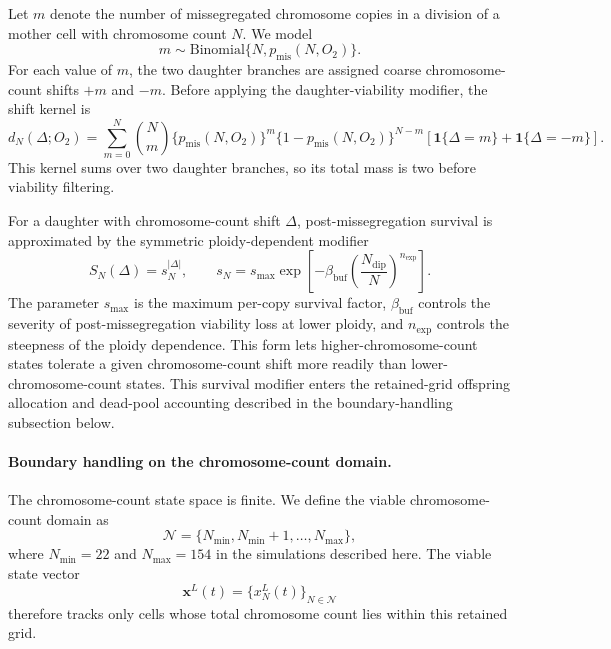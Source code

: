 \documentclass[11pt]{article}
\begin{document}
Let $m$ denote the number of missegregated chromosome copies in a division of a mother cell with chromosome count $N$. We model
\begin{equation}
m \sim \mathrm{Binomial}\{N,p_{\mathrm{mis}}(N,O_2)\}.
\label{eq:appendix_misseg_binomial}
\end{equation}
For each value of $m$, the two daughter branches are assigned coarse chromosome-count shifts $+m$ and $-m$. Before applying the daughter-viability modifier, the shift kernel is
\begin{equation}
d_N(\Delta;O_2)
=
\sum_{m=0}^{N}
\binom{N}{m}
\{p_{\mathrm{mis}}(N,O_2)\}^{m}
\{1-p_{\mathrm{mis}}(N,O_2)\}^{N-m}
\left[
\mathbf{1}\{\Delta=m\}
+
\mathbf{1}\{\Delta=-m\}
\right].
\label{eq:appendix_shift_kernel}
\end{equation}
This kernel sums over two daughter branches, so its total mass is two before viability filtering.

For a daughter with chromosome-count shift $\Delta$, post-missegregation survival is approximated by the symmetric ploidy-dependent modifier
\begin{equation}
S_N(\Delta)=s_N^{|\Delta|},
\qquad
s_N
=
s_{\max}
\exp\left[
-\beta_{\mathrm{buf}}\left(\frac{N_{\mathrm{dip}}}{N}\right)^{n_{\mathrm{exp}}}
\right].
\label{eq:appendix_survival_kernel}
\end{equation}
The parameter $s_{\max}$ is the maximum per-copy survival factor, $\beta_{\mathrm{buf}}$ controls the severity of post-missegregation viability loss at lower ploidy, and $n_{\mathrm{exp}}$ controls the steepness of the ploidy dependence. This form lets higher-chromosome-count states tolerate a given chromosome-count shift more readily than lower-chromosome-count states.
This survival modifier enters the retained-grid offspring allocation and dead-pool accounting described in the boundary-handling subsection below.

\paragraph{Boundary handling on the chromosome-count domain.}
The chromosome-count state space is finite. We define the viable chromosome-count domain as
\[
\mathcal{N}=\{N_{\min},N_{\min}+1,\ldots,N_{\max}\},
\]
where $N_{\min}=22$ and $N_{\max}=154$ in the simulations described here. The viable state vector
\[
\mathbf{x}^L(t)=\{x^L_N(t)\}_{N\in\mathcal{N}}
\]
therefore tracks only cells whose total chromosome count lies within this retained grid.
\end{document}
